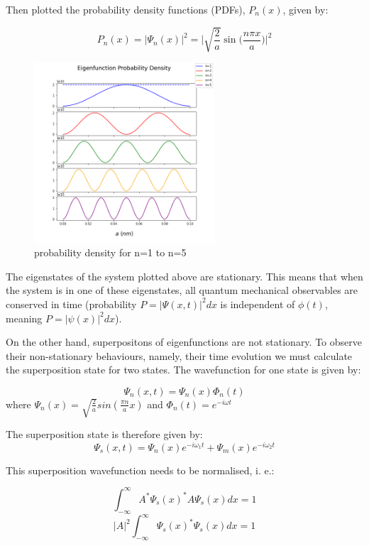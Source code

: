 Then plotted the probability density functions (PDFs), $P_n (x)$, given by:

$$P_n(x) = |\Psi_n(x)|^{2} = \Bigg|\sqrt{\frac{2}{a}}\sin\Big(\frac{n\pi x}{a}\Big)\Bigg|^{2}  $$

\begin{figure}[h]
    \centering
    \includegraphics[width=0.6\textwidth]{lab1/images/probabilityDensity.png} %
    \caption{probability density for n=1 to n=5}
    \label{fig:probDens}
\end{figure}

The eigenstates of the system plotted above are stationary. This means that when the system is in one of these eigenstates, all quantum mechanical observables are conserved in time (probability $P=|\Psi(x,t)|^2dx$ is independent of $\phi(t)$, meaning $P=|\psi(x)|^2dx$).

On the other hand, superpositons of eigenfunctions are not stationary. To observe their non-stationary behaviours, namely, their time evolution we must calculate the superposition state for two states. The wavefunction for one state is given by:

$$\Psi_n (x,t) = \Psi_n (x)\Phi_n (t)$$
where $\Psi_n (x)= \sqrt{\frac{2}{a}} sin(\frac{\pi n}{a}x)$ and $\Phi_n (t)= e^{-i \omega t}$

The superposition state is therefore given by:
\begin{equation} \label{eq:superPos}
\Psi_s (x,t) = \Psi_n (x)e^{-i \omega_{1} t} + \Psi_m (x)e^{-i \omega_{2} t}
\end{equation}


This superposition wavefunction needs to be normalised, i. e.:

$$\int_{ -\infty}^{\infty} A^{*} \Psi_s (x)^{*} A\Psi_s (x)dx = 1$$
$$\left | A \right |^2 \int_{ -\infty}^{\infty} \Psi_s (x)^{*} \Psi_s (x)dx = 1$$

